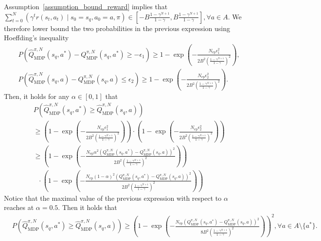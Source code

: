 \begin{myproof}
Assumption~\ref{assumption_bound_reward} implies that $ \sum_{t=0}^{N} \left( \gamma^t r(s_t, a_t) \mid s_0=s_q, a_0=a, \pi \right) \in [-B \frac{1-\gamma^{N+1}}{1-\gamma}, B \frac{1-\gamma^{N+1}}{1-\gamma}], \forall a \in A$. We therefore lower bound the two probabilities in the previous expression using Hoeffding’s inequality~\citep{hoeffding1994probability}
\begin{align}
    &P\left( \hat{Q}_\text{MDP}^{\pi, N}(s_q, a^*) - Q_\text{MDP}^{\pi, N}(s_q, a^*) \geq - \epsilon_1 \right) \geq  1 - \exp \left( - \frac{N_\text{ep} \epsilon_1^2}{2B^2 \left( \frac{1-\gamma^{N+1}}{1-\gamma}\right)^2} \right), \\ 
    &P \left( \hat{Q}_\text{MDP}^{\pi, N}(s_q, a) - Q_\text{MDP}^{\pi, N}(s_q, a) \leq \epsilon_2 \right) \geq  1 - \exp \left( - \frac{N_\text{ep} \epsilon_2^2}{2B^2 \left( \frac{1-\gamma^{N+1}}{1-\gamma}\right)^2} \right).
\end{align}
%
Then, it holds for any $\alpha \in [0, 1]$ that 
\begin{align}
    &P \left( \hat{Q}_\text{MDP}^{\pi, N}(s_q, a^*) \geq \hat{Q}_\text{MDP}^{\pi, N}(s_q, a) \right)  \\
    &\geq \left( 1 - \exp \left( - \frac{N_\text{ep} \epsilon_1^2}{2B^2 \left( \frac{1-\gamma^{N+1}}{1-\gamma}\right)^2} \right) \right) \cdot \left( 1 - \exp \left( - \frac{N_\text{ep} \epsilon_2^2}{2B^2 \left( \frac{1-\gamma^{N+1}}{1-\gamma}\right)^2} \right) \right) \\
    &\geq \left( 1 - \exp \left( - \frac{N_\text{ep} \alpha^2 \left( Q_\text{MDP}^{\pi, N}(s_q, a^*) - Q_\text{MDP}^{\pi, N}(s_q, a) \right) ^2}{2B^2 \left( \frac{1-\gamma^{N+1}}{1-\gamma}\right)^2} \right) \right) \\ 
    &\,\,\,\, \cdot \left( 1 - \exp \left( - \frac{N_\text{ep}  (1-\alpha)^2 \left( Q_\text{MDP}^{\pi, N}(s_q, a^*) - Q_\text{MDP}^{\pi, N}(s_q, a) \right) ^2 }{2B^2 \left( \frac{1-\gamma^{N+1}}{1-\gamma}\right)^2} \right) \right)
\end{align}
%
Notice that the maximal value of the previous expression with respect to $\alpha$ reaches at $\alpha = 0.5$. Then it holds that
\begin{align}
    &P \left( \hat{Q}_\text{MDP}^{\pi, N}(s_q, a^*) \geq \hat{Q}_\text{MDP}^{\pi, N}(s_q, a) \right) \geq \left( 1 - \exp \left( - \frac{N_\text{ep}  \left( Q_\text{MDP}^{\pi, N}(s_q, a^*) - Q_\text{MDP}^{\pi, N}(s_q, a) \right) ^2}{8B^2 \left( \frac{1-\gamma^{N+1}}{1-\gamma}\right)^2} \right) \right)^2, \forall a \in A \setminus \{a^*\}.
\end{align}

\end{myproof}
